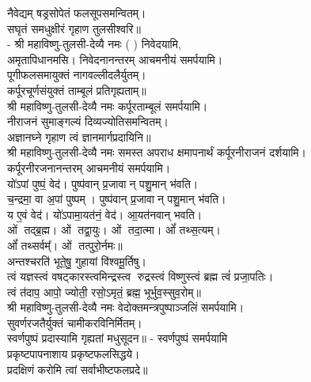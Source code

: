 नैवेद्यम् षड्रसोपेतं फलसूपसमन्वितम्।\\
सघृतं समधुक्षीरं गृहाण तुलसीश्वरि॥\\
- श्री महाविष्णु-तुलसी-देव्यै नमः (	) निवेदयामि, \\
अमृतापिधानमसि। निवेदनानन्तरम् आचमनीयं समर्पयामि।\\

पूगीफलसमायुक्तं नागवल्लीदलैर्युतम्।\\
कर्पूरचूर्णसंयुक्तं ताम्बूलं प्रतिगृह्यताम्॥\\
श्री महाविष्णु-तुलसी-देव्यै नमः कर्पूरताम्बूलं समर्पयामि।\\

नीराजनं सुमाङ्गल्यं दिव्यज्योतिसमन्वितम्।\\
अज्ञानघ्ने गृहाण त्वं ज्ञानमार्गप्रदायिनि॥\\
श्री महाविष्णु-तुलसी-देव्यै नमः समस्त अपराध क्षमापनार्थं कर्पूरनीराजनं दर्शयामि।\\
कर्पूरनीरजनानन्तरम् आचमनीयं समर्पयामि।\\

यो॑ऽपां पुष्पं॒ वेद॑। पुष्प॑वान् प्र॒जावान् पशु॒मान् भ॑वति।\\
च॒न्द्रमा॒ वा अ॒पां पुष्पम्। पुष्प॑वान् प्र॒जावान् पशु॒मान् भ॑वति।\\
य ए॒वं वेद॑। यो॑ऽपामा॒यत॑नं॒ वेद॑। आ॒यत॑नवान् भवति।\\

ओं तद्ब्र॒ह्म। ओं तद्वा॒युः। ओं तदा॒त्मा। ओं᳚ तथ्स॒त्यम्‌।\\
ओं᳚ तथ्सर्वम्᳚‌। ओं तत्पुरो॒र्नमः॥\\

अन्तश्चरति॑ भूते॒षु॒ गुहायां वि॑श्वमू॒र्तिषु। \\
त्वं यज्ञस्त्वं वषट्कारस्त्वमिन्द्रस्त्व रुद्रस्त्वं विष्णुस्त्वं ब्रह्म त्वं॑ प्रजा॒पतिः। \\
त्वं त॑दाप॒ आपो॒ ज्योती॒ रसो॒ऽमृतं॒ ब्रह्म॒ भूर्भुव॒स्सुव॒रोम्‌॥\\

श्री महाविष्णु-तुलसी-देव्यै नमः वेदोक्तमन्त्रपुष्पाञ्जलिं समर्पयामि।\\

सुवर्णरजतैर्युक्तं चामीकरविनिर्मितम्।\\
स्वर्णपुष्पं प्रदास्यामि गृह्यतां मधुसूदन॥ - स्वर्णपुष्पं समर्पयामि\\

प्रकृष्टपापनाशाय प्रकृष्टफलसिद्धये।\\
प्रदक्षिणं करोमि त्वां सर्वाभीष्टफलप्रदे॥\\

